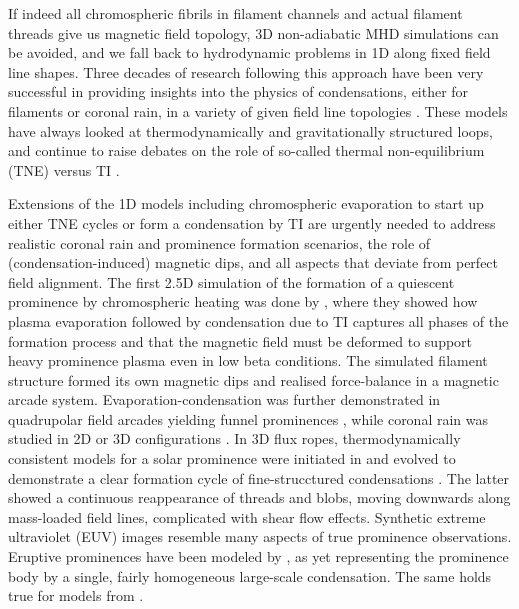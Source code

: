 If indeed all chromospheric fibrils in filament channels and actual filament threads give us magnetic field topology, 3D non-adiabatic MHD simulations can be avoided, and we fall back to hydrodynamic problems in 1D along fixed field line shapes. Three decades of research following this approach have been very successful in providing insights into the physics of condensations, either for filaments or coronal rain, in a variety of given field line topologies \citep{mok1990,antiochos2000,luna2012,xia2011}. These models have always looked at thermodynamically and gravitationally structured loops, and continue to raise debates on the role of so-called thermal non-equilibrium (\gls{TNE}) versus TI \citep{klimchuk2019,antolin2019}.

Extensions of the 1D models including chromospheric evaporation to start up either TNE cycles or form a condensation by TI are urgently needed to address realistic coronal rain and prominence formation scenarios, the role of (condensation-induced) magnetic dips, and all aspects that deviate from perfect field alignment. The first 2.5D simulation of the formation of a quiescent prominence by chromospheric heating was done by \citet{xia2012}, where they showed how plasma evaporation followed by condensation due to TI captures all phases of the formation process and that the magnetic field must be deformed to support heavy prominence plasma even in low beta conditions. The simulated filament structure formed its own magnetic dips and realised force-balance in a magnetic arcade system. Evaporation-condensation was further demonstrated in quadrupolar field arcades yielding funnel prominences \citep{keppens2014}, while coronal rain was studied in 2D \citep{fang2013,fang2015} or 3D configurations \citep{moschou2015, xia2017}. In 3D flux ropes, thermodynamically consistent models for a solar prominence were initiated in \citet{xia2014} and evolved to demonstrate a clear formation cycle of fine-strucctured condensations \citep{xia2016}. The latter showed a continuous reappearance of threads and blobs, moving downwards along mass-loaded field lines, complicated with shear flow effects. Synthetic extreme ultraviolet (\gls{EUV}) images resemble many aspects of true prominence observations. Eruptive prominences have been modeled by \citet{fan2017}, as yet representing the prominence body by a single, fairly homogeneous large-scale condensation. The same holds true for models from \citet{kaneko2015}.

